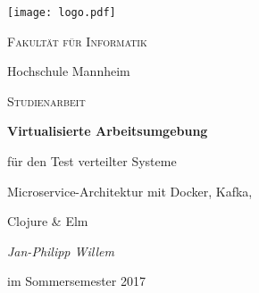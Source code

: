 \begin{titlepage}
{\texttt{[image: logo.pdf]}}\par
\vspace{4cm}
{\scshape\LARGE Fakultät für Informatik \par Hochschule Mannheim\par}
\vspace{0.66cm}
{\scshape\Large Studienarbeit\par}
\vspace{.033cm}
{\huge\bfseries Virtualisierte Arbeitsumgebung\par für den Test verteilter Systeme\par}
{\LARGE Microservice-Architektur mit Docker, Kafka,\par Clojure \& Elm\par}
\vspace{0.66cm}
{\Large\itshape Jan-Philipp Willem\par}
\vspace{.1cm}
{\Large im Sommersemester 2017}
\vfill
\end{titlepage}
